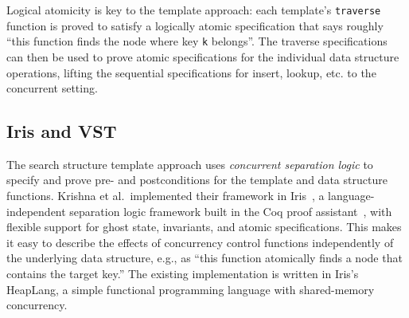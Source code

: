 \documentclass[a4paper,UKenglish,cleveref, autoref, thm-restate]{lipics-v2021}
\begin{document}

Logical atomicity is key to the template approach: each template's \lstinline{traverse} function is proved to satisfy a logically atomic specification that says roughly ``this function finds the node where key \lstinline{k} belongs''. The traverse specifications can then be used to prove atomic specifications for the individual data structure operations, lifting the sequential specifications for insert, lookup, etc. to the concurrent setting.

\subsection{Iris and VST}
The search structure template approach uses \emph{concurrent separation logic} to specify and prove pre- and postconditions for the template and data structure functions. Krishna et al.~implemented their framework in Iris~\cite{iris}, a language-independent separation logic framework built in the Coq proof assistant~\cite{coq}, with flexible support for ghost state, invariants, and atomic specifications. This makes it easy to describe the effects of concurrency control functions independently of the underlying data structure, e.g., as ``this function atomically finds a node that contains the target key.'' %
The existing implementation is written in Iris's HeapLang, a simple functional programming language with shared-memory concurrency.
\end{document}
